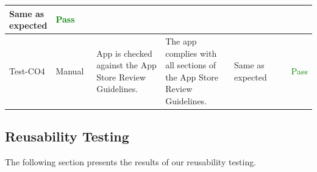\documentclass[12pt, titlepage]{article}
\begin{document}
\begin{table}[H]
{\begin{tabular}{|l|p{0.15\linewidth}|p{0.3\linewidth}|p{0.3\linewidth}|p{0.3\linewidth}|p{0.1\linewidth}|}
      Same as expected                                                                              &
      \textcolor{Green}{Pass}                                                                         \\
      \hline
      Test-CO4                                                                                      &
      Manual                                                                                        &
      App is checked against the App Store Review Guidelines.                                       &
      The app complies with all sections of the App Store Review Guidelines.                        &
      Same as expected                                                                              &
      \textcolor{Green}{Pass}                                                                         \\
      \hline
    \end{tabular}}
  \label{table:Compliance_Tests}
\end{table}

\subsection{Reusability Testing}
The following section presents the results of our reusability testing.
\end{document}
